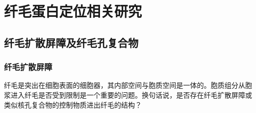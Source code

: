 \section{纤毛蛋白定位相关研究}
\subsection{纤毛扩散屏障及纤毛孔复合物}
\subsubsection{纤毛扩散屏障}
纤毛是突出在细胞表面的细胞器，其内部空间与胞质空间是一体的。胞质组分从胞浆进入纤毛是否受到限制是一个重要的问题。换句话说，是否存在纤毛扩散屏障或类似核孔复合物的控制物质进出纤毛的结构？

